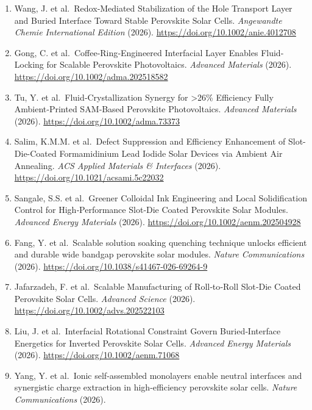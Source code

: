 \documentclass[
  11pt,
]{article}
\begin{document}
\begin{enumerate}
  Zhang, J. et al.~Area‐Selective Atomic Layer Deposition of AlO x at
  the Buried Interface for High‐Performance Perovskite Solar Cells.
  \emph{Angewandte Chemie International Edition} (2026).
  \url{https://doi.org/10.1002/anie.202516537}
\item
  Wang, J. et al.~Redox‐Mediated Stabilization of the Hole Transport
  Layer and Buried Interface Toward Stable Perovskite Solar Cells.
  \emph{Angewandte Chemie International Edition} (2026).
  \url{https://doi.org/10.1002/anie.4012708}
\item
  Gong, C. et al.~Coffee‐Ring‐Engineered Interfacial Layer Enables
  Fluid‐Locking for Scalable Perovskite Photovoltaics. \emph{Advanced
  Materials} (2026). \url{https://doi.org/10.1002/adma.202518582}
\item
  Tu, Y. et al.~Fluid‐Crystallization Synergy for \textgreater26\%
  Efficiency Fully Ambient‐Printed SAM‐Based Perovskite Photovoltaics.
  \emph{Advanced Materials} (2026).
  \url{https://doi.org/10.1002/adma.73373}
\item
  Salim, K.M.M. et al.~Defect Suppression and Efficiency Enhancement of
  Slot-Die-Coated Formamidinium Lead Iodide Solar Devices via Ambient
  Air Annealing. \emph{ACS Applied Materials \& Interfaces} (2026).
  \url{https://doi.org/10.1021/acsami.5c22032}
\item
  Sangale, S.S. et al.~Greener Colloidal Ink Engineering and Local
  Solidification Control for High‐Performance Slot‐Die Coated Perovskite
  Solar Modules. \emph{Advanced Energy Materials} (2026).
  \url{https://doi.org/10.1002/aenm.202504928}
\item
  Fang, Y. et al.~Scalable solution soaking quenching technique unlocks
  efficient and durable wide bandgap perovskite solar modules.
  \emph{Nature Communications} (2026).
  \url{https://doi.org/10.1038/s41467-026-69264-9}
\item
  Jafarzadeh, F. et al.~Scalable Manufacturing of Roll‐to‐Roll Slot‐Die
  Coated Perovskite Solar Cells. \emph{Advanced Science} (2026).
  \url{https://doi.org/10.1002/advs.202522103}
\item
  Liu, J. et al.~Interfacial Rotational Constraint Govern
  Buried‐Interface Energetics for Inverted Perovskite Solar Cells.
  \emph{Advanced Energy Materials} (2026).
  \url{https://doi.org/10.1002/aenm.71068}
\item
  Yang, Y. et al.~Ionic self-assembled monolayers enable neutral
  interfaces and synergistic charge extraction in high-efficiency
  perovskite solar cells. \emph{Nature Communications} (2026).

\end{enumerate}
\end{document}
